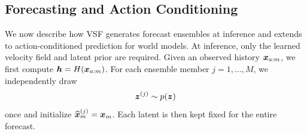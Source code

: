 \documentclass{article} %
\numberwithin{equation}{section}
\newcommand{\pan}[1]{\textcolor{red}{PL: #1}}
\begin{document}


\subsection{Forecasting and Action Conditioning}
\label{sec:vsf-inference}

We now describe how VSF generates forecast ensembles at inference and extends to action-conditioned prediction for world models. At inference, only the learned velocity field and latent prior are required. Given an observed history ${\bm{x}}_{a:m}$, we first compute
${\bm{h}}=H({\bm{x}}_{a:m})$. For each ensemble member $j=1,\ldots,M$, we independently draw
%
\begin{equation}
    {\bm{z}}^{(j)}\sim p({\bm{z}})
    \label{eq:vsf_inference_latents}
\end{equation}
%
once and initialize $\widehat{{\bm{x}}}_m^{(j)}={\bm{x}}_m$. Each latent is then kept fixed for the entire forecast.
\end{document}
